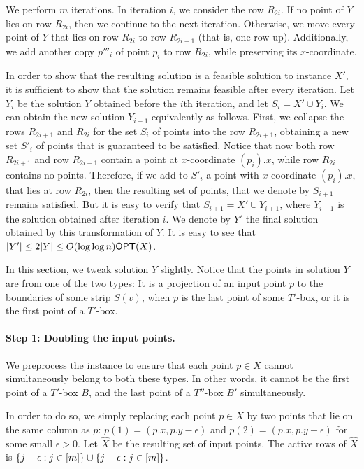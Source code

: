 \documentclass[11pt]{article}
\numberwithin{equation}{section}
\theoremstyle{definition}
\theoremstyle{plain}
\begin{document}
We perform $m$ iterations. In iteration $i$, we consider the row $R_{2i}$. If no point of $Y$ lies on row $R_{2i}$, then we continue to the next iteration. Otherwise, we move every point of $Y$ that lies on row $R_{2i}$ to row $R_{2i+1}$ (that is, one row up). Additionally, we add another copy $p'''_i$ of point $p_i$ to row $R_{2i}$, while preserving its $x$-coordinate.

In order to show that the resulting solution is a feasible solution to instance $X'$, it is sufficient to show that the solution remains feasible after every iteration. Let $Y_i$ be the solution $Y$ obtained before the $i$th iteration, and let $S_i=X'\cup Y_i$. We can obtain the new solution $Y_{i+1}$ equivalently as follows. First, we collapse the rows $R_{2i+1}$ and $R_{2i}$ for the set $S_i$ of points into the row $R_{2i+1}$, obtaining a new set $S'_i$ of points that is guaranteed to be satisfied. Notice that now both row $R_{2i+1}$ and row $R_{2i-1}$ contain a point at $x$-coordinate $(p_i).x$, while row $R_{2i}$ contains no points. Therefore, if we add to $S'_i$ a point with $x$-coordinate $(p_i).x$, that lies at row $R_{2i}$, then the resulting set of points, that we denote by $S_{i+1}$ remains satisfied. But it is easy to verify that $S_{i+1}=X'\cup Y_{i+1}$, where $Y_{i+1}$ is the solution obtained after iteration $i$.
We denote by $Y'$ the final solution obtained by this transformation of $Y$. It is easy to see that $|Y'|\leq 2|Y|\leq O(\log\log n)\mbox{\sf OPT}(X)$.



\iffalse
In this section, we tweak solution $Y$ slightly. 
Notice that the points in solution $Y$ are from one of the two types: It is a projection of an input point $p$ to the boundaries of some strip $S(v)$, when $p$ is the last point of some $T'$-box, or it is the first point of a $T'$-box. 


\paragraph*{Step 1: Doubling the input points.} We preprocess the instance to ensure that each point $p \in X$ cannot simultaneously belong to both these types. In other words, it cannot be the first point of a $T'$-box $B$, and the last point of a $T''$-box $B'$ simultaneously.

In order to do so, we simply replacing each point $p\in X$ by two points that lie on the same column as $p$: $p(1) = (p.x, p.y-\epsilon)$ and $p(2) = (p.x, p.y+\epsilon)$ for some small $\epsilon >0$.  Let $\hat{X}$ be the resulting set of input points. The active rows of $\hat{X}$ is $\left\{ j + \epsilon: j \in [m] \right\}\cup \left\{ j-\epsilon: j \in [m] \right\}$.  
\end{document}
